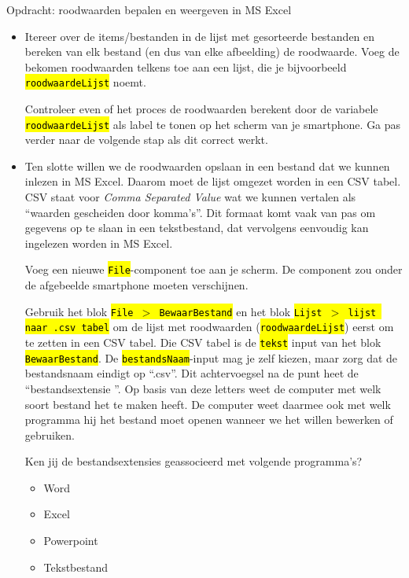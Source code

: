 \begin{opdracht}{Opdracht: roodwaarden bepalen en weergeven in MS Excel}
\begin{enumerate}
\begin{itemize}
			\item Itereer over de items/bestanden in de lijst met gesorteerde bestanden en bereken van elk bestand (en dus van elke afbeelding) de roodwaarde. Voeg de bekomen roodwaarden telkens toe aan een lijst, die je bijvoorbeeld \hl{\texttt{roodwaardeLijst}} noemt.
			
			Controleer even of het proces de roodwaarden berekent door de variabele \hl{\texttt{roodwaardeLijst}} als label te tonen op het scherm van je smartphone. Ga pas verder naar de volgende stap als dit correct werkt.
			
			\item Ten slotte willen we de roodwaarden opslaan in een bestand dat we kunnen inlezen in MS Excel. Daarom moet de lijst omgezet worden in een CSV tabel. CSV staat voor \emph{Comma Separated Value} wat we kunnen vertalen als \textquotedblleft waarden gescheiden door komma's\textquotedblright. Dit formaat komt vaak van pas om gegevens op te slaan in een tekstbestand, dat vervolgens eenvoudig kan ingelezen worden in MS Excel.
			
			Voeg een nieuwe \hl{\texttt{File}}-component toe aan je scherm. De component zou onder de afgebeelde smartphone moeten verschijnen. 
			
			Gebruik het blok \hl{\texttt{File $>$ BewaarBestand}} en het blok \hl{\texttt{Lijst $>$ lijst naar .csv tabel}} om de lijst met roodwaarden (\hl{\texttt{roodwaardeLijst}}) eerst om te zetten in een CSV tabel. Die CSV tabel is de \hl{\texttt{tekst}} input van het blok \hl{\texttt{BewaarBestand}}. De \hl{\texttt{bestandsNaam}}-input mag je zelf kiezen, maar zorg dat de bestandsnaam eindigt op \textquotedblleft .csv\textquotedblright. Dit achtervoegsel na de punt heet de \textquotedblleft bestandsextensie \textquotedblright. Op basis van deze letters weet de computer met welk soort bestand het te maken heeft. De computer weet daarmee ook met welk programma hij het bestand moet openen wanneer we het willen bewerken of gebruiken.
			
			\begin{oef}
			Ken jij de bestandsextensies geassocieerd met volgende programma's?
						
			\begin{itemize}
			\item Word
			\item Excel
			\item Powerpoint
			\item Tekstbestand
			\end{itemize}
			\end{oef}
			

\end{itemize}
\end{enumerate}
\end{opdracht}
